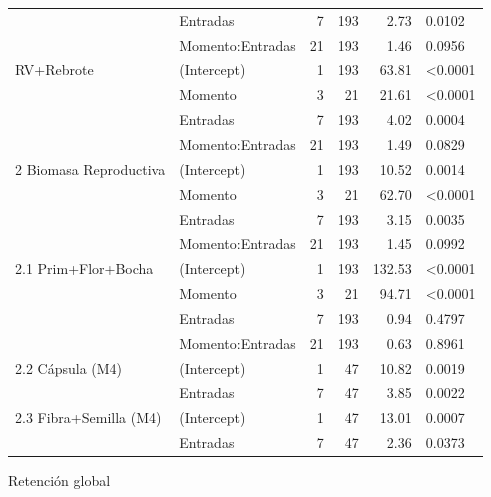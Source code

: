 \documentclass[12pt,oneside]{reedthesis}
\begin{document}
\begin{table}[!h]
{\begin{tabular}[t]{llrrrl}
 & Entradas & 7 & 193 & 2.73 & 0.0102\\
 & Momento:Entradas & 21 & 193 & 1.46 & 0.0956\\
\addlinespace
1.4 RV+Rebrote & (Intercept) & 1 & 193 & 63.81 & <0.0001\\
 & Momento & 3 & 21 & 21.61 & <0.0001\\
 & Entradas & 7 & 193 & 4.02 & 0.0004\\
 & Momento:Entradas & 21 & 193 & 1.49 & 0.0829\\
2 Biomasa Reproductiva & (Intercept) & 1 & 193 & 10.52 & 0.0014\\
\addlinespace
 & Momento & 3 & 21 & 62.70 & <0.0001\\
 & Entradas & 7 & 193 & 3.15 & 0.0035\\
 & Momento:Entradas & 21 & 193 & 1.45 & 0.0992\\
2.1 Prim+Flor+Bocha & (Intercept) & 1 & 193 & 132.53 & <0.0001\\
 & Momento & 3 & 21 & 94.71 & <0.0001\\
\addlinespace
 & Entradas & 7 & 193 & 0.94 & 0.4797\\
 & Momento:Entradas & 21 & 193 & 0.63 & 0.8961\\
2.2 Cápsula (M4) & (Intercept) & 1 & 47 & 10.82 & 0.0019\\
 & Entradas & 7 & 47 & 3.85 & 0.0022\\
2.3 Fibra+Semilla (M4) & (Intercept) & 1 & 47 & 13.01 & 0.0007\\
\addlinespace
 & Entradas & 7 & 47 & 2.36 & 0.0373\\
\bottomrule
\end{tabular}}
\end{table}

Retención global
\end{document}
